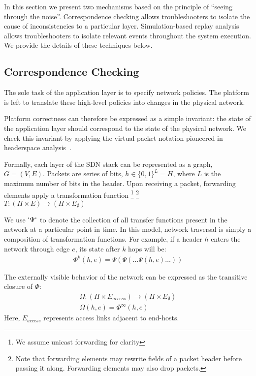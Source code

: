 In this section we present two mechanisms based on the principle of ``seeing
through the noise''. Correspondence checking allows troubleshooters to isolate
the cause of inconsistencies to a particular layer. Simulation-based replay analysis 
allows troubleshooters to isolate relevant events throughout the system
execution. We provide the details of these techniques below. 

\subsection{Correspondence Checking}

The sole task of the application layer is to specify network
policies. The platform is left to translate these high-level policies
into changes in the physical network.

Platform correctness can therefore be expressed as a simple invariant:
the state of the application layer should correspond to the state of the
physical network. We check this invariant by applying the virtual packet notation pioneered
in headerspace analysis~\cite{hsa}. 

Formally, each layer of the SDN stack can be represented as a graph,
$G = (V, E)$. Packets are series of bits, $h \in \{0,1\}^L = H$,
where $L$ is the maximum number of bits in the header. Upon receiving a packet,
forwarding elements apply a transformation function \footnote{We assume unicast forwarding for clarity}
\footnote{Note that forwarding elements may rewrite fields of a packet header
before passing it along. Forwarding elements may also drop packets.} \\
$T: (H \times E) \rightarrow (H \times E_{\emptyset})$

We use $`\Psi`$ to denote the collection of all transfer functions present in
the network at a particular point in time. In this model, network traversal is simply a composition of transformation
functions. For example, if a header $h$ enters the network through edge
$e$, its state after $k$ hops will be:
\begin{align*}
\Phi^k(h,e) = \Psi(\Psi(\dots \Psi(h,e)\dots))
\end{align*}

The externally visible behavior of the network can be expressed as the
transitive closure of $\Phi$:
\begin{align*}
\Omega: (H \times E_{access}) \rightarrow (H \times E_{\emptyset}) \\
\Omega(h,e) = \Phi^{\infty}(h,e)
\end{align*}
Here, $E_{access}$ represents access links adjacent to end-hosts.

